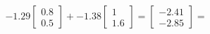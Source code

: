 \documentclass[preview]{standalone}
\begin{document}
\begin{align*}
-1.29 \begin{bmatrix} 0.8 \\ 0.5 \end{bmatrix} + -1.38 \begin{bmatrix} 1 \\ 1.6 \end{bmatrix} = \begin{bmatrix} -2.41 \\ -2.85 \end{bmatrix} =
\end{align*}
\end{document}
